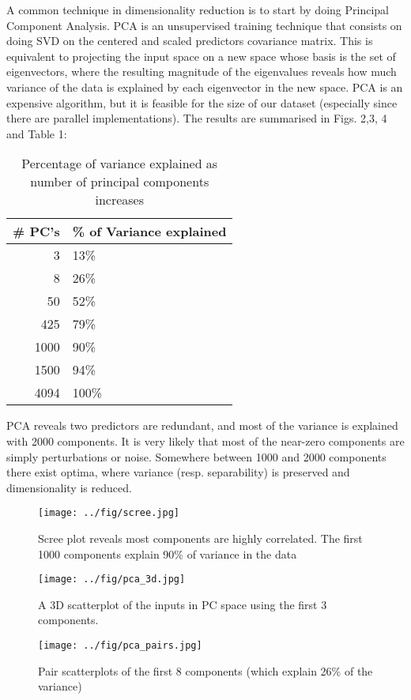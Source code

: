 \documentclass[conference,final,]{IEEEtran}
\makeatletter
\def\maxwidth{\ifdim\Gin@nat@width>\linewidth\linewidth
\else\Gin@nat@width\fi}
\let\Oldincludegraphics\includegraphics
\renewcommand{\includegraphics}[1]{\Oldincludegraphics[width=\maxwidth]{#1}}
\makeatother
\begin{document}
A common technique in dimensionality reduction is to start by doing
Principal Component Analysis. PCA is an unsupervised training technique
that consists on doing SVD on the centered and scaled predictors
covariance matrix. This is equivalent to projecting the input space on a
new space whose basis is the set of eigenvectors, where the resulting
magnitude of the eigenvalues reveals how much variance of the data is
explained by each eigenvector in the new space. PCA is an expensive
algorithm, but it is feasible for the size of our dataset (especially
since there are parallel implementations). The results are summarised in
Figs. 2,3, 4 and Table 1:

\begin{table}[htbp]
\caption{\label{tab:org1e2928b}
Percentage of variance explained as number of principal components increases}
\centering
\begin{tabular}{rl}
\# PC's & \% of Variance explained\\
\hline
3 & 13\%\\
8 & 26\%\\
50 & 52\%\\
425 & 79\%\\
1000 & 90\%\\
1500 & 94\%\\
4094 & 100\%\\
\end{tabular}
\end{table}

PCA reveals two predictors are redundant, and most of the variance is
explained with 2000 components. It is very likely that most of the
near-zero components are simply perturbations or noise. Somewhere
between 1000 and 2000 components there exist optima, where variance
(resp. separability) is preserved and dimensionality is reduced.

\begin{figure}
\centering
\texttt{[image: ../fig/scree.jpg]}
\caption{Scree plot reveals most components are highly correlated. The
first 1000 components explain 90\% of variance in the data}
\end{figure}

\begin{figure}
\centering
\texttt{[image: ../fig/pca\_3d.jpg]}
\caption{A 3D scatterplot of the inputs in PC space using the first 3
components.}
\end{figure}

\begin{figure}
\centering
\texttt{[image: ../fig/pca\_pairs.jpg]}
\caption{Pair scatterplots of the first 8 components (which explain 26\%
of the variance)}
\end{figure}
\end{document}
